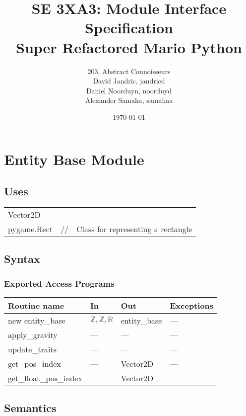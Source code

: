 \documentclass[12pt]{article}
\title{SE 3XA3: Module Interface Specification\\Super Refactored Mario Python}
\author{203, Abstract Connoisseurs 
		\\ David Jandric, jandricd
		\\ Daniel Noorduyn, noorduyd
		\\ Alexander Samaha, samahaa
}
\date{\today}
\begin{document}
\maketitle

\newpage

\section*{Entity Base Module}

\subsection* {Uses}

\begin{tabular}{lll}
    Vector2D & &\\
    pygame.Rect & // & Class for representing a rectangle\\
\end{tabular}

\subsection* {Syntax}

\subsubsection* {Exported Access Programs}

\begin{tabular}{| l | l | l | l |}
\hline
\textbf{Routine name} & \textbf{In} & \textbf{Out} & \textbf{Exceptions}\\
\hline
new entity\_base & $\mathbb{Z, Z, R}$ & entity\_base & ---\\
\hline
apply\_gravity & --- & --- & ---\\
\hline
update\_traits & --- & --- & ---\\
\hline
get\_pos\_index & --- & Vector2D & ---\\
\hline
get\_float\_pos\_index & --- & Vector2D & ---\\
\hline
\end{tabular}

\subsection* {Semantics}
\end{document}
